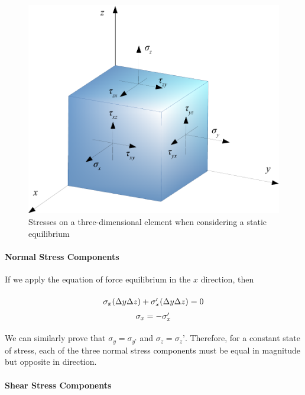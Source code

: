 \documentclass[
10pt,
a4paper,
openany,
svgnames,
]{book} %
\begin{document}
\begin{figure}[h]
  \centering
  \includegraphics[scale=0.5]{pictures/Static-body-load-analysis/3d-element-stress}
  \caption{Stresses on a three-dimensional element when considering a static equilibrium}
  \label{fig: 3d-stress-element}
\end{figure}
  
\paragraph{Normal Stress Components}

If we apply the equation of force equilibrium in the $x$ direction, then

\begin{equation}
  \arraycolsep=1.4pt\def\arraystretch{1.5}
  \begin{array}{c}
    {\sigma _x}(\Delta y\Delta z) + \sigma_x'(\Delta y\Delta z) = 0\\
    {\sigma _x} =  - \sigma_x'
  \end{array}
\end{equation}

We can similarly prove that $\sigma_y = \sigma_{y’}$ and $\sigma_z = \sigma_z’$. Therefore, for a constant state of stress, each of the three normal stress components must be equal in magnitude but opposite in direction.

\paragraph{Shear Stress Components}
\end{document}
